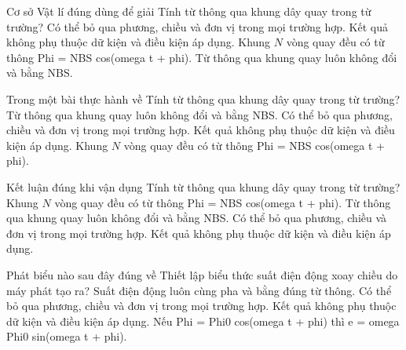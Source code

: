 \begin{ex}
Cơ sở Vật lí đúng dùng để giải Tính từ thông qua khung dây quay trong từ trường?
\choice
{Có thể bỏ qua phương, chiều và đơn vị trong mọi trường hợp.}
{Kết quả không phụ thuộc dữ kiện và điều kiện áp dụng.}
{\True Khung $N$ vòng quay đều có từ thông Phi = NBS cos(omega t + phi).}
{Từ thông qua khung quay luôn không đổi và bằng NBS.}
\end{ex}

\begin{ex}
Trong một bài thực hành về Tính từ thông qua khung dây quay trong từ trường?
\choice
{Từ thông qua khung quay luôn không đổi và bằng NBS.}
{Có thể bỏ qua phương, chiều và đơn vị trong mọi trường hợp.}
{Kết quả không phụ thuộc dữ kiện và điều kiện áp dụng.}
{\True Khung $N$ vòng quay đều có từ thông Phi = NBS cos(omega t + phi).}
\end{ex}

\begin{ex}
Kết luận đúng khi vận dụng Tính từ thông qua khung dây quay trong từ trường?
\choice
{\True Khung $N$ vòng quay đều có từ thông Phi = NBS cos(omega t + phi).}
{Từ thông qua khung quay luôn không đổi và bằng NBS.}
{Có thể bỏ qua phương, chiều và đơn vị trong mọi trường hợp.}
{Kết quả không phụ thuộc dữ kiện và điều kiện áp dụng.}
\end{ex}

\begin{ex}
Phát biểu nào sau đây đúng về Thiết lập biểu thức suất điện động xoay chiều do máy phát tạo ra?
\choice
{Suất điện động luôn cùng pha và bằng đúng từ thông.}
{Có thể bỏ qua phương, chiều và đơn vị trong mọi trường hợp.}
{Kết quả không phụ thuộc dữ kiện và điều kiện áp dụng.}
{\True Nếu Phi = Phi0 cos(omega t + phi) thì e = omega Phi0 sin(omega t + phi).}
\end{ex}

